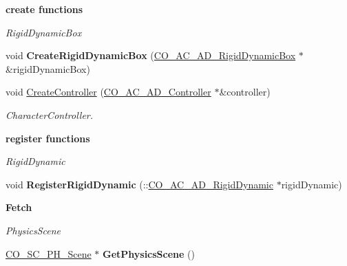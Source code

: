 \begin{Indent}{\bf create functions}\par
{\em \label{_amgrp51b34d861ebe0927d3cb889fc3d4b9ff}
 RigidDynamicBox }\begin{DoxyCompactItemize}
\item 
\hypertarget{classContent_1_1Scene_1_1Admin_1_1Scene_a50f91d5fe56c5a7b5ded097e88c62abe}{
void {\bfseries CreateRigidDynamicBox} (\hyperlink{classContent_1_1Actor_1_1Admin_1_1RigidDynamicBox}{CO\_\-AC\_\-AD\_\-RigidDynamicBox} $\ast$\&rigidDynamicBox)}
\label{classContent_1_1Scene_1_1Admin_1_1Scene_a50f91d5fe56c5a7b5ded097e88c62abe}

\item 
\hypertarget{classContent_1_1Scene_1_1Admin_1_1Scene_a7ed66bbc68271087417c2f2167b386b7}{
void \hyperlink{classContent_1_1Scene_1_1Admin_1_1Scene_a7ed66bbc68271087417c2f2167b386b7}{CreateController} (\hyperlink{classContent_1_1Actor_1_1Admin_1_1Controller}{CO\_\-AC\_\-AD\_\-Controller} $\ast$\&controller)}
\label{classContent_1_1Scene_1_1Admin_1_1Scene_a7ed66bbc68271087417c2f2167b386b7}

\begin{DoxyCompactList}\small\item\em CharacterController. \item\end{DoxyCompactList}\end{DoxyCompactItemize}
\end{Indent}
\begin{Indent}{\bf register functions}\par
{\em \label{_amgrp74151e0c44c9df43fcf80837230dbc8a}
 RigidDynamic }\begin{DoxyCompactItemize}
\item 
\hypertarget{classContent_1_1Scene_1_1Admin_1_1Scene_a47239510e6ada2af32b9f31741b0b699}{
void {\bfseries RegisterRigidDynamic} (::\hyperlink{classContent_1_1Actor_1_1Admin_1_1RigidDynamic}{CO\_\-AC\_\-AD\_\-RigidDynamic} $\ast$rigidDynamic)}
\label{classContent_1_1Scene_1_1Admin_1_1Scene_a47239510e6ada2af32b9f31741b0b699}

\end{DoxyCompactItemize}
\end{Indent}
\begin{Indent}{\bf Fetch}\par
{\em \label{_amgrp4ea7755f84f02d23876d90be2f9765cf}
 PhysicsScene }\begin{DoxyCompactItemize}
\item 
\hypertarget{classContent_1_1Scene_1_1Admin_1_1Scene_abfe7eb6d393a4f317e8f72e27f1abaa2}{
\hyperlink{classContent_1_1Scene_1_1Physics_1_1Scene}{CO\_\-SC\_\-PH\_\-Scene} $\ast$ {\bfseries GetPhysicsScene} ()}
\label{classContent_1_1Scene_1_1Admin_1_1Scene_abfe7eb6d393a4f317e8f72e27f1abaa2}

\end{DoxyCompactItemize}
\end{Indent}
